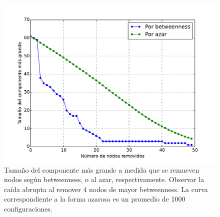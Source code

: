 \begin{figure}
\centering
\includegraphics[scale = 0.60]{figuras/Nodos_removidos-eps-converted-to.pdf} 
\caption{Tamaño del componente más grande a medida que se remueven nodos según betweenness, o al azar, respectivamente. Observar la caída abrupta al remover 4 nodos de mayor betweenness. La curva correspondiente a la forma azarosa es un promedio de 1000 configuraciones.}
\label{fig:Comparacion}
\end{figure}
